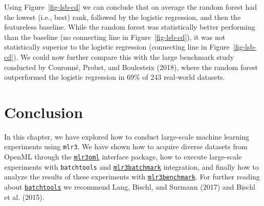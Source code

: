 Using Figure~\ref{fig-lsb-cd} we can conclude that on average the random
forest had the lowest (i.e., best) rank, followed by the logistic
regression, and then the featureless baseline. While the random forest
was statistically better performing than the baseline (no connecting
line in Figure~\ref{fig-lsb-cd}), it was not statistically superior to
the logistic regression (connecting line in Figure~\ref{fig-lsb-cd}). We
could now further compare this with the large benchmark study conducted
by Couronné, Probst, and Boulesteix (2018), where the random forest
outperformed the logistic regression in 69\% of 243 real-world datasets.

\hypertarget{conclusion-9}{%
\section{Conclusion}\label{conclusion-9}}

In this chapter, we have explored how to conduct large-scale machine
learning experiments using \texttt{mlr3}. We have shown how to acquire
diverse datasets from OpenML through the
\href{https://mlr3oml.mlr-org.com}{\texttt{mlr3oml}}
interface package, how to execute large-scale experiments with
\texttt{batchtools} and
\href{https://mlr3batchmark.mlr-org.com}{\texttt{mlr3batchmark}}
integration, and finally how to analyze the results of these experiments
with
\href{https://mlr3benchmark.mlr-org.com}{\texttt{mlr3benchmark}}.
For further reading about
\href{https://cran.r-project.org/package=batchtools}{\texttt{batchtools}}
we recommend Lang, Bischl, and Surmann (2017) and Bischl et al. (2015).

